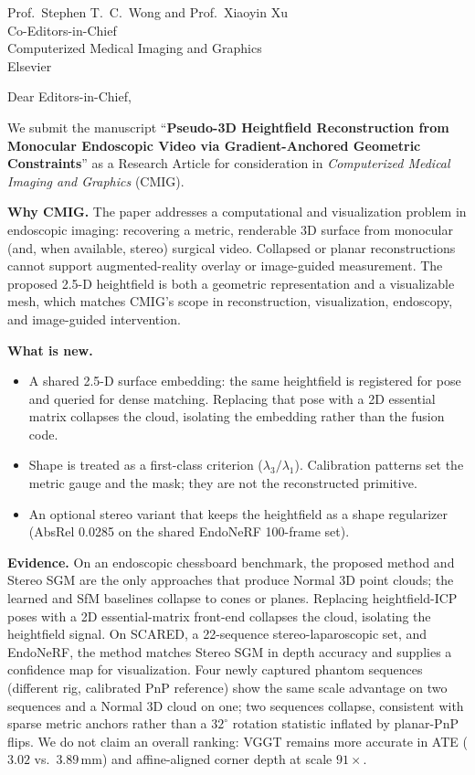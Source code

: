 \documentclass[12pt]{letter}
\begin{document}
\begin{letter}{Prof.\ Stephen T.\ C.\ Wong and Prof.\ Xiaoyin Xu\\
Co-Editors-in-Chief\\
Computerized Medical Imaging and Graphics\\
Elsevier}

\opening{Dear Editors-in-Chief,}

We submit the manuscript
``\textbf{Pseudo-3D Heightfield Reconstruction from Monocular Endoscopic Video via Gradient-Anchored Geometric Constraints}''
as a Research Article for consideration in \textit{Computerized Medical Imaging and Graphics} (CMIG).

\textbf{Why CMIG.}
The paper addresses a computational and visualization problem in endoscopic imaging: recovering a metric, renderable 3D surface from monocular (and, when available, stereo) surgical video. Collapsed or planar reconstructions cannot support augmented-reality overlay or image-guided measurement. The proposed 2.5-D heightfield is both a geometric representation and a visualizable mesh, which matches CMIG's scope in reconstruction, visualization, endoscopy, and image-guided intervention.

\textbf{What is new.}
\begin{itemize}
    \item A shared 2.5-D surface embedding: the same heightfield is registered for pose and queried for dense matching. Replacing that pose with a 2D essential matrix collapses the cloud, isolating the embedding rather than the fusion code.
    \item Shape is treated as a first-class criterion ($\lambda_3/\lambda_1$). Calibration patterns set the metric gauge and the mask; they are not the reconstructed primitive.
    \item An optional stereo variant that keeps the heightfield as a shape regularizer (AbsRel 0.0285 on the shared EndoNeRF 100-frame set).
\end{itemize}

\textbf{Evidence.}
On an endoscopic chessboard benchmark, the proposed method and Stereo SGM are the only approaches that produce Normal 3D point clouds; the learned and SfM baselines collapse to cones or planes. Replacing heightfield-ICP poses with a 2D essential-matrix front-end collapses the cloud, isolating the heightfield signal. On SCARED, a 22-sequence stereo-laparoscopic set, and EndoNeRF, the method matches Stereo SGM in depth accuracy and supplies a confidence map for visualization. Four newly captured phantom sequences (different rig, calibrated PnP reference) show the same scale advantage on two sequences and a Normal 3D cloud on one; two sequences collapse, consistent with sparse metric anchors rather than a $32^{\circ}$ rotation statistic inflated by planar-PnP flips. We do not claim an overall ranking: VGGT remains more accurate in ATE ($3.02$ vs.\ $3.89$\,mm) and affine-aligned corner depth at scale $91{\times}$.


\end{letter}
\end{document}
